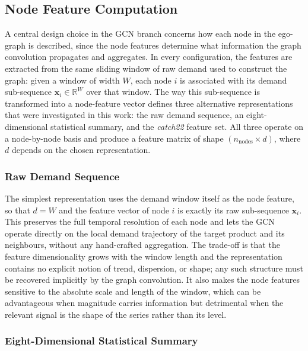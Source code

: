 \subsection{Node Feature Computation}

A central design choice in the GCN branch concerns how each node in the
ego-graph is described, since the node features determine what information
the graph convolution propagates and aggregates. In every configuration, the
features are extracted from the same sliding window of raw demand used to
construct the graph: given a window of width $W$, each node $i$ is associated
with its demand sub-sequence $\mathbf{x}_i \in \mathbb{R}^{W}$ over that
window. The way this sub-sequence is transformed into a node-feature vector
defines three alternative representations that were investigated in this work:
the raw demand sequence, an eight-dimensional statistical summary, and the
\textit{catch22} feature set. All three operate on a node-by-node basis and
produce a feature matrix of shape $(n_\text{nodes} \times d)$, where $d$ depends
on the chosen representation.

\subsubsection{Raw Demand Sequence}

The simplest representation uses the demand window itself as the node feature,
so that $d = W$ and the feature vector of node $i$ is exactly its raw
sub-sequence $\mathbf{x}_i$. This preserves the full temporal resolution of
each node and lets the GCN operate directly on the local demand trajectory of
the target product and its neighbours, without any hand-crafted aggregation.
The trade-off is that the feature dimensionality grows with the window length
and the representation contains no explicit notion of trend, dispersion, or
shape; any such structure must be recovered implicitly by the graph
convolution. It also makes the node features sensitive to the absolute scale
and length of the window, which can be advantageous when magnitude carries
information but detrimental when the relevant signal is the shape of the
series rather than its level.

\subsubsection{Eight-Dimensional Statistical Summary}

